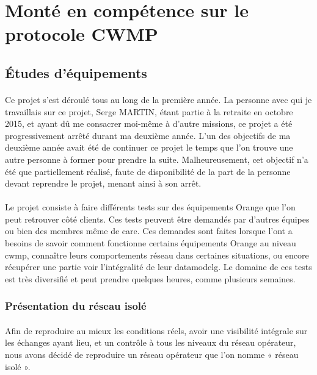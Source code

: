 \documentclass[12pt,a4paper]{report}
\begin{document}
\newpage
\section{Monté en compétence sur le protocole CWMP}
\subsection{Études d'équipements}
\paragraph*{}Ce projet s'est déroulé tous au long de la première année. La personne avec qui je travaillais sur ce projet, Serge MARTIN, étant partie à la retraite en octobre 2015, et ayant dû me consacrer moi-même à d'autre missions, ce projet a été progressivement arrêté durant ma deuxième année. L'un des objectifs de ma deuxième année avait été de continuer ce projet le temps que l'on trouve une autre personne à former pour prendre la suite. Malheureusement, cet objectif n'a été que partiellement réalisé, faute de disponibilité de la part de la personne devant reprendre le projet, menant ainsi à son arrêt.
\paragraph*{}Le projet consiste à faire différents tests sur des équipements Orange que l’on peut retrouver côté clients. Ces tests peuvent être demandés par d'autres équipes ou bien des membres même de \gls{care}. Ces demandes sont faites lorsque l'ont a besoins de savoir comment fonctionne certains équipements Orange au niveau \gls{cwmp}, connaître leurs comportements réseau dans certaines situations, ou encore récupérer une partie voir l'intégralité de leur \gls{datamodelg}. Le domaine de ces tests est très diversifié et peut prendre quelques heures, comme plusieurs semaines. \\
\subsubsection{Présentation du réseau isolé}
\paragraph*{}Afin de reproduire au mieux les conditions réels, avoir une visibilité intégrale sur les échanges ayant lieu, et un contrôle à tous les niveaux du réseau opérateur, nous avons décidé de reproduire un réseau opérateur que l’on nomme « réseau isolé ». 
\end{document}

